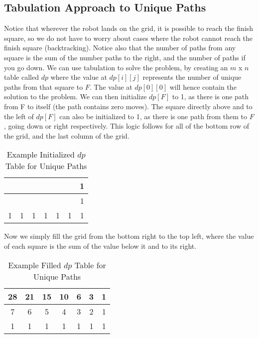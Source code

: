 \subsection{Tabulation Approach to Unique Paths}
Notice that wherever the robot lands on the grid, it is possible to reach the finish square,
so we do not have to worry about cases where the robot cannot reach the finish square (backtracking).
Notice also that the number of paths from any square is the sum of the number paths to the right, and the number of paths if you go down.
We can use tabulation to solve the problem, by creating an $m$ x $n$ table called $dp$ where the value at $dp[i][j]$ represents the number of unique paths from that square to $F$.
The value at $dp[0][0]$ will hence contain the solution to the problem.
We can then initialize $dp[F]$ to 1, as there is one path from F to itself (the path contains zero moves).
The square directly above and to the left of $dp[F]$ can also be initialized to 1, as there is one path from them to $F$, going down or right respectively. This logic follows for all of the bottom row of the grid, and the last column of the grid.

\begin{table}[H]
    \centering
    \begin{tabular}{|c|c|c|c|c|c|c|}
        \hline
         &  &  &  &  &  & 1 \\
        \hline
         &  &  &  &  &  & 1 \\
        \hline
        1 & 1 & 1 & 1 & 1 & 1 & 1 \\
        \hline
    \end{tabular}
    \caption{Example Initialized $dp$ Table for Unique Paths}
\end{table}

Now we simply fill the grid from the bottom right to the top left,
where the value of each square is the sum of the value below it and to its right.

\begin{table}[H]
    \centering
    \begin{tabular}{|c|c|c|c|c|c|c|}
        \hline
        28 & 21 & 15 & 10 & 6 & 3 & 1 \\
        \hline
        7 & 6 & 5 & 4 & 3 & 2 & 1 \\
        \hline
        1 & 1 & 1 & 1 & 1 & 1 & 1 \\
        \hline
    \end{tabular}
    \caption{Example Filled $dp$ Table for Unique Paths}
\end{table}

